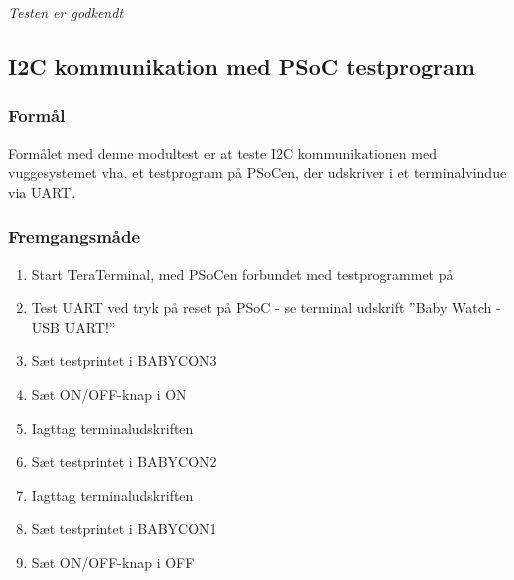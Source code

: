 


\textit{Testen er godkendt}












\subsection*{I2C kommunikation med PSoC testprogram}

\subsubsection*{Formål}
Formålet med denne modultest er at teste I2C kommunikationen med vuggesystemet vha. et testprogram på PSoCen, der udskriver i et terminalvindue via UART.

\subsubsection*{Fremgangsmåde}
\begin{enumerate}
\item Start TeraTerminal, med PSoCen forbundet med testprogrammet på
\item Test UART ved tryk på reset på PSoC - se terminal udskrift ''Baby Watch - USB UART!''
\item Sæt testprintet i BABYCON3
\item Sæt ON/OFF-knap i ON
\item Iagttag terminaludskriften
\item Sæt testprintet i BABYCON2 
\item Iagttag terminaludskriften
\item Sæt testprintet i BABYCON1
\item Sæt ON/OFF-knap i OFF
\end{enumerate}

